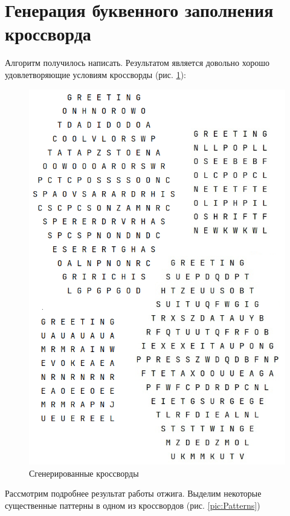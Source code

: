 \documentclass[12pt]{report}
\begin{document}
\section{Генерация буквенного заполнения кроссворда}
Алгоритм получилось написать. Результатом является довольно хорошо удовлетворяющие условиям кроссворды (рис. \ref{pic:GenCross}):
\begin{figure}[p!]
 \centering
    \includegraphics[scale=1.0]{generated8.png}
    \caption{\label{pic:GenCross}Сгенерированные кроссворды}
\end{figure}
Рассмотрим подробнее результат работы отжига. Выделим некоторые существенные паттерны в одном из кроссвордов (рис. \ref{pic:Patterns})
\end{document}

